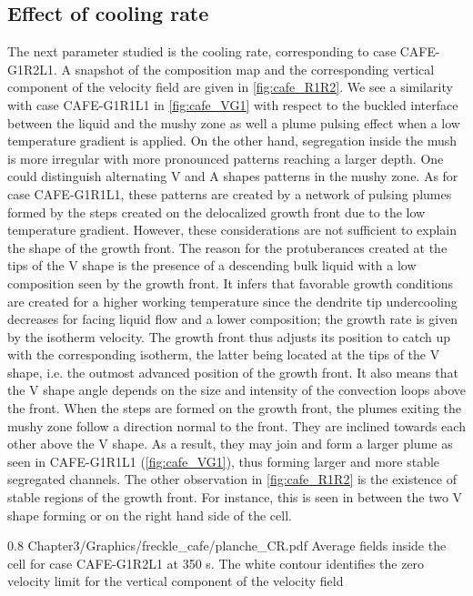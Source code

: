 \subsection{Effect of cooling rate}
The next parameter studied is the cooling rate, corresponding to case CAFE-G1R2L1. A snapshot of the composition map 
and the corresponding vertical component of the velocity field are given in \cref{fig:cafe_R1R2}. We see a similarity 
with case CAFE-G1R1L1 in \cref{fig:cafe_VG1} with respect to the buckled interface between the liquid and the mushy 
zone as well a plume pulsing effect when a low temperature gradient is applied. On the other hand, segregation inside 
the mush is more irregular with more pronounced patterns reaching a larger depth. One could distinguish alternating V  
and A shapes patterns in the mushy zone. As for case CAFE-G1R1L1, these patterns are created by a network of pulsing 
plumes formed by the steps created on the delocalized growth front due to the low temperature gradient. However, these 
considerations are not sufficient to explain the shape of the growth front. The reason for the protuberances created at 
the tips of the V shape is the presence of a descending bulk liquid with a low composition seen by the growth front. It 
infers that favorable growth conditions are created for a higher working temperature since the dendrite tip undercooling 
decreases for facing liquid flow and a lower composition; the growth rate is given by the isotherm velocity. The growth 
front thus adjusts its position to catch up with the corresponding isotherm, the latter being located at the tips of the 
V shape, i.e. the outmost advanced position of the growth front. It also means that the V shape angle depends on the size 
and intensity of the convection loops above the front. When the steps are formed on the growth front, the plumes exiting 
the mushy zone follow a direction normal to the front. They are inclined towards each other above the V shape. As a result, 
they may join and form a larger plume as seen in CAFE-G1R1L1 (\cref{fig:cafe_VG1}), thus forming larger and more stable segregated channels. 
The other observation in \cref{fig:cafe_R1R2} is the existence of stable regions of the growth front. For instance, this is seen 
in between the two V shape forming or on the right hand side of the cell. 
%
\begin{figureth}
{0.8}
{Chapter3/Graphics/freckle_cafe/planche_CR.pdf}
{Average fields inside the cell for case CAFE-G1R2L1 at 350 s. 
The white contour identifies the zero velocity limit for the vertical component of the velocity field}
\label{fig:cafe_R1R2}
\end{figureth}
